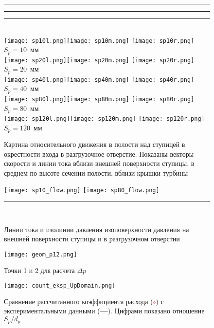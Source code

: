 \clearpage
\thispagestyle{empty}
\begin{figure}[!hb]
  \centering
   \rule{15mm}{0mm}  
  \rule{20mm}{0mm}  \rule{5mm}{0mm} \\
  \texttt{[image: sp10l.png]}\hfil\texttt{[image: sp10m.png]}\hfil
  \texttt{[image: sp10r.png]} \\
  $S_p = 10$~мм \\
  \texttt{[image: sp20l.png]}\hfil\texttt{[image: sp20m.png]}\hfil
  \texttt{[image: sp20r.png]} \\
  $S_p = 20$~мм \\
  \texttt{[image: sp40l.png]}\hfil\texttt{[image: sp40m.png]}\hfil
  \texttt{[image: sp40r.png]} \\
  $S_p = 40$~мм \\
  \texttt{[image: sp80l.png]}\hfil\texttt{[image: sp80m.png]}\hfil
  \texttt{[image: sp80r.png]} \\
  $S_p = 80$~мм \\
  \texttt{[image: sp120l.png]}\hfil\texttt{[image: sp120m.png]}\hfil
  \texttt{[image: sp120r.png]} \\
  $S_p = 120$~мм \\
  \caption{Картина относительного движения в полости над ступицей в окрестности входа в разгрузочное 
  отверстие. Показаны векторы скорости и линии тока вблизи внешней поверхности ступицы, в среднем по высоте сечении полости, вблизи крышки турбины}
  \label{fig3:30}
\end{figure}
 
\begin{figure}[!b]
  \centering
  \texttt{[image: sp10\_flow.png]}\hfill 
  \texttt{[image: sp80\_flow.png]}\\
   \rule{55mm}{0mm}  \\
  \caption{Линии тока и изолинии давления изоповерхности давления на внешней поверхности 
  ступицы и в разгрузочном отверстии}
  \label{fig3:31}
\end{figure}

\begin{figure}[!b]
  \centering
  \texttt{[image: geom\_p12.png]}\\[-5mm]
  \caption{Точки 1 и 2 для расчета $\Delta p$}
  \label{fig3:32}
\end{figure}

\clearpage
\begin{figure}[!t]
  \centering
  \texttt{[image: count\_eksp\_UpDomain.png]}\\[-5mm]
  \caption{Сравнение рассчитанного коэффициента расхода (\textcolor{red}{$\circ$}) с экспериментальными 
  данными ({\textbf{---}}). Цифрами показано отношение $S_p/d_p$}
  \label{fig3:33}
\end{figure}
\rule{0mm}{20mm}

